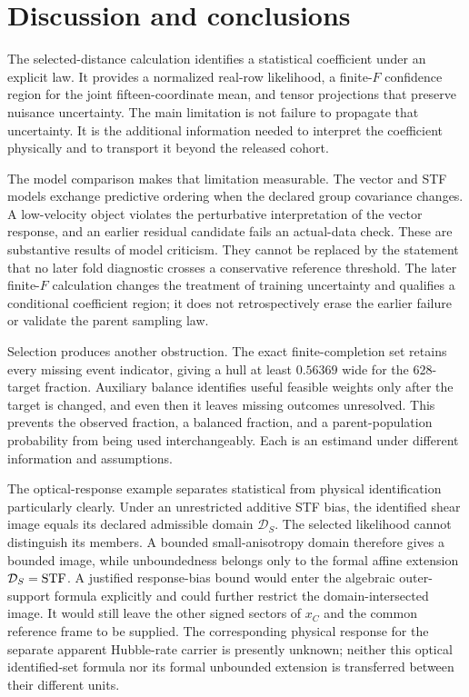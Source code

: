 \section{Discussion and conclusions}
\label{sec:discussion}

The selected-distance calculation identifies a statistical coefficient under an explicit law. It provides a normalized real-row likelihood, a finite-$F$ confidence region for the joint fifteen-coordinate mean, and tensor projections that preserve nuisance uncertainty. The main limitation is not failure to propagate that uncertainty. It is the additional information needed to interpret the coefficient physically and to transport it beyond the released cohort.

The model comparison makes that limitation measurable. The vector and STF models exchange predictive ordering when the declared group covariance changes. A low-velocity object violates the perturbative interpretation of the vector response, and an earlier residual candidate fails an actual-data check. These are substantive results of model criticism. They cannot be replaced by the statement that no later fold diagnostic crosses a conservative reference threshold. The later finite-$F$ calculation changes the treatment of training uncertainty and qualifies a conditional coefficient region; it does not retrospectively erase the earlier failure or validate the parent sampling law.

Selection produces another obstruction. The exact finite-completion set retains every missing event indicator, giving a hull at least $0.56369$ wide for the 628-target fraction. Auxiliary balance identifies useful feasible weights only after the target is changed, and even then it leaves missing outcomes unresolved. This prevents the observed fraction, a balanced fraction, and a parent-population probability from being used interchangeably. Each is an estimand under different information and assumptions.

The optical-response example separates statistical from physical identification particularly clearly. Under an unrestricted additive STF bias, the identified shear image equals its declared admissible domain $\mathcal D_S$. The selected likelihood cannot distinguish its members. A bounded small-anisotropy domain therefore gives a bounded image, while unboundedness belongs only to the formal affine extension $\mathcal D_S=\mathrm{STF}$. A justified response-bias bound would enter the algebraic outer-support formula explicitly and could further restrict the domain-intersected image. It would still leave the other signed sectors of $x_C$ and the common reference frame to be supplied. The corresponding physical response for the separate apparent Hubble-rate carrier is presently unknown; neither this optical identified-set formula nor its formal unbounded extension is transferred between their different units.

